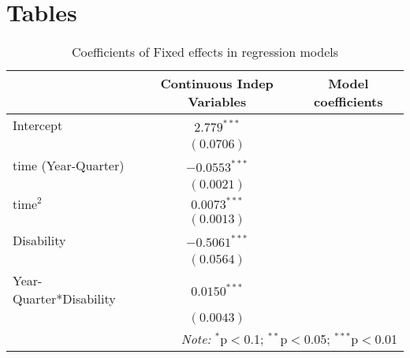 
\section{Tables}

\noindent
\begin{table}[H] 
\centering 
\footnotesize
\begin{tabular}{l|c|c}
\hline 
\hline 
%
& Continuous Indep Variables & Model coefficients \\
\hline 
Intercept		&	$2.779^{***}$		 		\\
			&	$(0.0706)$				\\
time (Year-Quarter)	&	$-0.0553^{***}$		 	\\
			&	$(0.0021)$				\\
$\text{time}^2$		&	$0.0073^{***}$				\\
			&	$(0.0013)$				\\
Disability		&	$-0.5061^{***}$				\\    
			&	$(0.0564)$				\\
Year-Quarter*Disability	&	$0.0150^{***}$			\\
			&	$(0.0043)$				\\
\hline 
\hline 
\multicolumn{3}{r}{\textit{Note:}  $^{*}$p$<$0.1; $^{**}$p$<$0.05; $^{***}$p$<$0.01} \\ 

\end{tabular}
\caption{Coefficients of Fixed effects in regression models} 
\label{tab:FixedEffectsBetas} 
\end{table}


